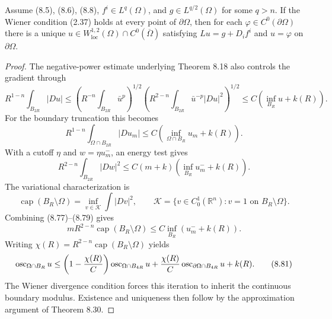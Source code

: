 \begin{theorem}
\label{gt-thm-8-31-continuous-dirichlet-wiener}
Assume (8.5), (8.6), (8.8), $f^i\in L^q(\Omega)$, and
$g\in L^{q/2}(\Omega)$ for some $q>n$. If the Wiener condition (2.37) holds at
every point of $\partial\Omega$, then for each $\varphi\in C^0(\partial\Omega)$
there is a unique
$u\in W^{1,2}_{\mathrm{loc}}(\Omega)\cap C^0(\overline\Omega)$ satisfying
$Lu=g+D_if^i$ and $u=\varphi$ on $\partial\Omega$.
\end{theorem}
\begin{proof}
\sketch The negative-power estimate underlying Theorem 8.18 also controls
the gradient through
\begin{equation}
\tag{8.76}
R^{1-n}\int_{B_{2R}}|Du|
\leq\left(R^{-n}\int_{B_{2R}}\bar u^p\right)^{1/2}
\left(R^{2-n}\int_{B_{2R}}\bar u^{-p}|Du|^2\right)^{1/2}
\leq C(\inf_{B_R}u+k(R)).
\end{equation}
For the boundary truncation this becomes
\begin{equation}
\tag{8.77}
R^{1-n}\int_{\Omega\cap B_{2R}}|Du_m|
\leq C(\inf_{\Omega\cap B_R}u_m+k(R)).
\end{equation}
With a cutoff $\eta$ and $w=\eta u_m^-$, an energy test gives
\begin{equation}
\tag{8.78}
R^{2-n}\int_{B_{2R}}|Dw|^2
\leq C(m+k)(\inf_{B_R}u_m^-+k(R)).
\end{equation}
The variational characterization is
\begin{equation}
\tag{8.79}
\operatorname{cap}(B_R\setminus\Omega)
=\inf_{v\in\mathcal K}\int|Dv|^2,
\qquad
\mathcal K=\{v\in C_0^1(\mathbb R^n):v=1\text{ on }B_R\setminus\Omega\}.
\end{equation}
Combining (8.77)--(8.79) gives
\begin{equation}
mR^{2-n}\operatorname{cap}(B_R\setminus\Omega)
\leq C\inf_{B_R}(u_m^-+k(R)).
\tag{8.80}
\end{equation}
Writing $\chi(R)=R^{2-n}\operatorname{cap}(B_R\setminus\Omega)$ yields
\begin{equation}
\operatorname{osc}_{\Omega\cap B_R}u
\leq\left(1-\frac{\chi(R)}C\right)\operatorname{osc}_{\Omega\cap B_{4R}}u
+\frac{\chi(R)}C\operatorname{osc}_{\partial\Omega\cap B_{4R}}u+k(R).
\tag{8.81}
\end{equation}
The Wiener divergence condition forces this iteration to inherit the continuous
boundary modulus. Existence and uniqueness then follow by the approximation
argument of Theorem 8.30.
\end{proof}

